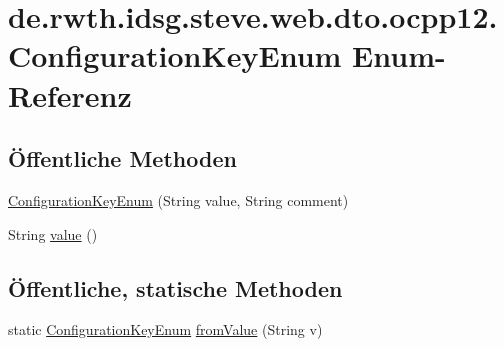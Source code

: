 \hypertarget{enumde_1_1rwth_1_1idsg_1_1steve_1_1web_1_1dto_1_1ocpp12_1_1_configuration_key_enum}{\section{de.\+rwth.\+idsg.\+steve.\+web.\+dto.\+ocpp12.\+Configuration\+Key\+Enum Enum-\/\+Referenz}
\label{enumde_1_1rwth_1_1idsg_1_1steve_1_1web_1_1dto_1_1ocpp12_1_1_configuration_key_enum}
}
\subsection*{Öffentliche Methoden}
\begin{DoxyCompactItemize}
\item 
\hyperlink{enumde_1_1rwth_1_1idsg_1_1steve_1_1web_1_1dto_1_1ocpp12_1_1_configuration_key_enum_a55ac9e316f1d678ac308a25fe76bf2e0}{Configuration\+Key\+Enum} (String value, String comment)
\item 
String \hyperlink{enumde_1_1rwth_1_1idsg_1_1steve_1_1web_1_1dto_1_1ocpp12_1_1_configuration_key_enum_a98a7a4f3a4ce62c7b6c3bd0f374921b3}{value} ()
\end{DoxyCompactItemize}
\subsection*{Öffentliche, statische Methoden}
\begin{DoxyCompactItemize}
\item 
static \hyperlink{enumde_1_1rwth_1_1idsg_1_1steve_1_1web_1_1dto_1_1ocpp12_1_1_configuration_key_enum}{Configuration\+Key\+Enum} \hyperlink{enumde_1_1rwth_1_1idsg_1_1steve_1_1web_1_1dto_1_1ocpp12_1_1_configuration_key_enum_a77a10114ee142333bc38006bfe72d459}{from\+Value} (String v)
\end{DoxyCompactItemize}
